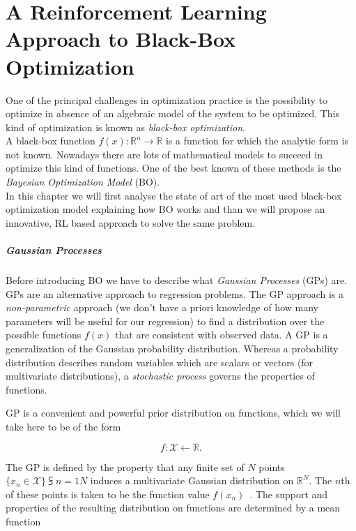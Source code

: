 \chapter{A Reinforcement Learning Approach to Black-Box Optimization}

One of the principal challenges in optimization practice is the possibility to optimize in absence of an algebraic model of the system to be optimized. This kind of optimization is known as \textit{black-box optimization}. \\

A black-box function $f(x) : \mathbb{R}^n \rightarrow \mathbb{R}$ is a function for which the analytic form is not known. Nowadays there are lots of mathematical models to succeed in optimize this kind of functions. One of the best known of these methods is the \textit{Bayesian Optimization Model} (BO). \\

In this chapter we will first analyse the state of art of the most used black-box optimization model explaining how BO works and than we will propose an innovative, RL based approach to solve the same problem.

\paragraph{Gaussian Processes} Before introducing BO we have to describe what \textit{Gaussian Processes} (GPs) are. GPs are an alternative approach to regression problems. The GP approach is a \textit{non-parametric} approach (we don't have a priori knowledge of how many parameters will be useful for our regression) to find a distribution over the possible functions $f(x)$ that are consistent with observed data. A GP is a generalization of the Gaussian probability distribution. Whereas a probability distribution describes random variables which are scalars or vectors (for multivariate distributions), a \textit{stochastic process} governs the properties of functions.

GP is a convenient and powerful prior distribution on functions, which we will take here to be of the form 

\begin{equation}
	f : \mathcal{X} \leftarrow \mathbb{R}.
\end{equation}

The GP is defined by the property that any finite set of $N$ points $\{x_n \in \mathcal{X}\}\subsup{}{ n=1}{N}$ induces a multivariate Gaussian distribution  on $\mathbb{R}^N$. The $n$th of these points is taken to be the function value $f(x_n)$~\cite{NIPS2012_4522}. The support and properties of the resulting distribution on functions are determined by a mean function 

